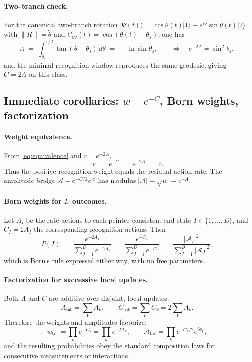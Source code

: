 \documentclass[11pt,letterpaper]{article}
\theoremstyle{definition}
\begin{document}
\paragraph{Two-branch check.}
For the canonical two-branch rotation \(\lvert\Psi(t)\rangle=\cos\theta(t)\lvert 1\rangle+e^{i\phi}\sin\theta(t)\lvert 2\rangle\) with \(\|R\|=\dot\theta\) and \(C_{\mathrm{ov}}(t)=\cos(\theta(t)-\theta_s)\), one has
\[
A\;=\;\int_{\theta_s}^{\pi/2}\!\tan(\theta-\theta_s)\,d\theta\;=\;-\ln\sin\theta_s,\qquad
\Rightarrow\quad e^{-2A}=\sin^2\theta_s,
\]
and the minimal recognition window reproduces the same geodesic, giving \(C=2A\) on this class.

\subsection{Immediate corollaries: \(w=e^{-C}\), Born weights, factorization}

\paragraph{Weight equivalence.}
From \eqref{eq:equivalence} and \(r=e^{-2A}\),
\begin{equation}
w\;=\;e^{-C}\;=\;e^{-2A}\;=\;r.
\label{eq:w-equals-rate}
\end{equation}
Thus the positive recognition weight equals the residual-action rate. The amplitude bridge \(\mathcal A=e^{-C/2}e^{i\phi}\) has modulus \(|\mathcal A|=\sqrt w=e^{-A}\).

\paragraph{Born weights for \(D\) outcomes.}
Let \(A_I\) be the rate actions to each pointer-consistent end-state \(I\in\{1,\dots,D\}\), and \(C_I=2A_I\) the corresponding recognition actions. Then
\begin{equation}
P(I)\;=\;\frac{e^{-2A_I}}{\sum_{J=1}^D e^{-2A_J}}
\;=\;\frac{e^{-C_I}}{\sum_{J=1}^D e^{-C_J}}
\;=\;\frac{|\mathcal A_I|^2}{\sum_{J=1}^D |\mathcal A_J|^2},
\end{equation}
which is Born’s rule expressed either way, with no free parameters.

\paragraph{Factorization for successive local updates.}
Both \(A\) and \(C\) are additive over disjoint, local updates:
\[
A_{\mathrm{tot}}=\sum_k A_k,\qquad C_{\mathrm{tot}}=\sum_k C_k=2\sum_k A_k.
\]
Therefore the weights and amplitudes factorize,
\[
w_{\mathrm{tot}}=\prod_k e^{-C_k}=\prod_k e^{-2A_k},\qquad
\mathcal A_{\mathrm{tot}}=\prod_k e^{-C_k/2}e^{i\phi_k},
\]
and the resulting probabilities obey the standard composition laws for consecutive measurements or interactions.
\end{document}
